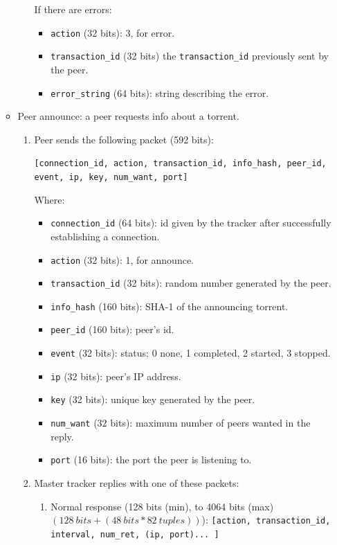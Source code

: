 \documentclass[twoside,a4paper,10pt]{article}
\begin{document}
\begin{itemize}
\begin{itemize}
\begin{enumerate}
      If there are errors:
      \begin{itemize}
      \item \texttt{action} (32 bits): 3, for error.
      \item \texttt{transaction\_id} (32 bits)
        the \texttt{transaction\_id} previously sent by the peer.
      \item \texttt{error\_string} (64 bits): string describing the error.
      \end{itemize}
    \end{enumerate}
  \item Peer announce: a peer requests info about a torrent.
    \begin{enumerate}
    \item Peer sends the following packet (592 bits):

      \texttt{[connection\_id, action, transaction\_id, info\_hash, peer\_id,
          event, ip, key, num\_want, port]}

      Where:
      \begin{itemize}
      \item \texttt{connection\_id} (64 bits): id given by the tracker after
        successfully establishing a connection.
      \item \texttt{action} (32 bits): 1, for announce.
      \item \texttt{transaction\_id} (32 bits): random number generated by the
        peer.
      \item \texttt{info\_hash} (160 bits): SHA-1 of the announcing torrent.
      \item \texttt{peer\_id} (160 bits): peer's id.
      \item \texttt{event} (32 bits): status; 0 none, 1 completed, 2 started,
        3 stopped.
      \item \texttt{ip} (32 bits): peer's IP address.
      \item \texttt{key} (32 bits): unique key generated by the peer.
      \item \texttt{num\_want} (32 bits): maximum number of peers wanted in the
        reply. %
      \item \texttt{port} (16 bits): the port the peer is listening to.
      \end{itemize}
    \item Master tracker replies with one of these packets:

      \begin{enumerate}
      \item Normal response (128 bits (min), to 4064 bits (max)
        $(128\ bits + (48\ bits * 82\ tuples))$):
        \texttt{[action, transaction\_id, interval, num\_ret, (ip, port)... ]}
        

\end{enumerate}
\end{enumerate}
\end{itemize}
\end{itemize}
\end{document}
